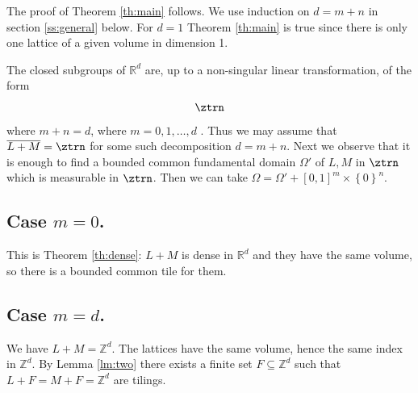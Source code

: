 \documentclass[12pt,a4paper,oneside]{amsart}
\theoremstyle{plain}
\theoremstyle{definition}
\newcommand{\Set}[1]{{\left\{{#1}\right\}}}
\newcommand{\RR}{{\mathbb R}}
\newcommand{\ZZ}{{\mathbb Z}}
\newcounter{rem}
\begin{document}


The proof of Theorem \ref{th:main} follows.
{We use induction on $d=m+n$ in section \ref{ss:general} below. For $d=1$ Theorem \ref{th:main} is true since there is only one lattice of a given volume in dimension 1.}

The closed subgroups of $\RR^d$ are, up to a non-singular linear transformation, of the form
\begin{equation}\label{close-subgroup}
\ztrn
\end{equation}
where $m+n=d$, where $m=0, 1, \ldots, d$ \cite[Theorem 9.11]{hewitt2012abstract}. Thus we may assume that $\overline{L+M} = \ztrn$ for some such decomposition $d=m+n$. Next we observe that it is enough to find a bounded common fundamental domain $\Omega'$ of $L,M$ in $\ztrn$ which is measurable in $\ztrn$. Then we can take $\Omega = \Omega'+[0,1]^m\times\Set{0}^n$. %

\subsection{Case $m=0$.}

This is Theorem \ref{th:dense}: $L+M$ is dense in $\RR^d$ and they have the same volume, so there is a bounded common tile for them. %

\subsection{Case $m=d$.}

We have $L+M = \ZZ^d$. The lattices have the same volume, hence the same index in $\ZZ^d$. By Lemma \ref{lm:two} there exists a finite set $F \subseteq \ZZ^d$ such that $L+F = M + F = \ZZ^d$ are tilings. %
\end{document}

